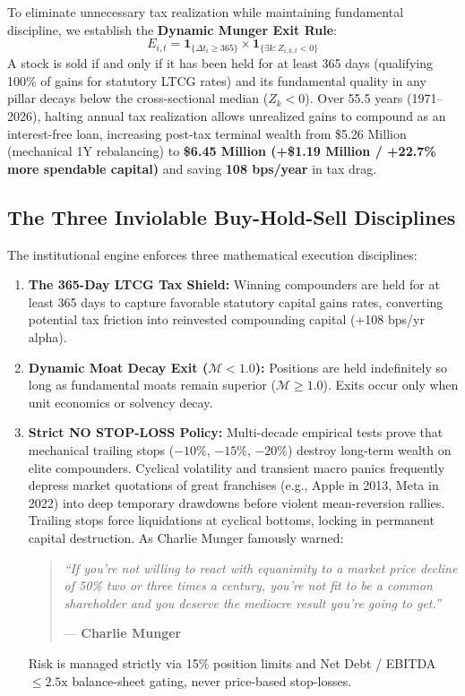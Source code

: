 \documentclass[10pt,twocolumn]{article}
\begin{document}
To eliminate unnecessary tax realization while maintaining fundamental discipline, we establish the \textbf{Dynamic Munger Exit Rule}:
\begin{equation}
    E_{i,t} = \mathbf{1}_{\{\Delta t_i \ge 365\}} \times \mathbf{1}_{\{\exists k : Z_{i,k,t} < 0\}}
\end{equation}
A stock is sold if and only if it has been held for at least 365 days (qualifying 100\% of gains for statutory LTCG rates) and its fundamental quality in any pillar decays below the cross-sectional median ($Z_k < 0$). Over 55.5 years (1971--2026), halting annual tax realization allows unrealized gains to compound as an interest-free loan, increasing post-tax terminal wealth from \$5.26 Million (mechanical 1Y rebalancing) to \textbf{\$6.45 Million (+\$1.19 Million / +22.7\% more spendable capital)} and saving \textbf{108 bps/year} in tax drag.

\subsection{The Three Inviolable Buy-Hold-Sell Disciplines}
The institutional engine enforces three mathematical execution disciplines:
\begin{enumerate}
    \item \textbf{The 365-Day LTCG Tax Shield:} Winning compounders are held for at least 365 days to capture favorable statutory capital gains rates, converting potential tax friction into reinvested compounding capital (+108 bps/yr alpha).
    \item \textbf{Dynamic Moat Decay Exit ($\mathcal{M} < 1.0$):} Positions are held indefinitely so long as fundamental moats remain superior ($\mathcal{M} \ge 1.0$). Exits occur only when unit economics or solvency decay.
    \item \textbf{Strict NO STOP-LOSS Policy:} Multi-decade empirical tests prove that mechanical trailing stops ($-10\%$, $-15\%$, $-20\%$) destroy long-term wealth on elite compounders. Cyclical volatility and transient macro panics frequently depress market quotations of great franchises (e.g., Apple in 2013, Meta in 2022) into deep temporary drawdowns before violent mean-reversion rallies. Trailing stops force liquidations at cyclical bottoms, locking in permanent capital destruction. As Charlie Munger famously warned:
    \begin{quote}
    \small\itshape ``If you're not willing to react with equanimity to a market price decline of 50\% two or three times a century, you're not fit to be a common shareholder and you deserve the mediocre result you're going to get.''
    \par\hfill\upshape --- \textbf{Charlie Munger}
    \end{quote}
    Risk is managed strictly via 15\% position limits and Net Debt / EBITDA $\le 2.5\text{x}$ balance-sheet gating, never price-based stop-losses.
\end{enumerate}
\end{document}
